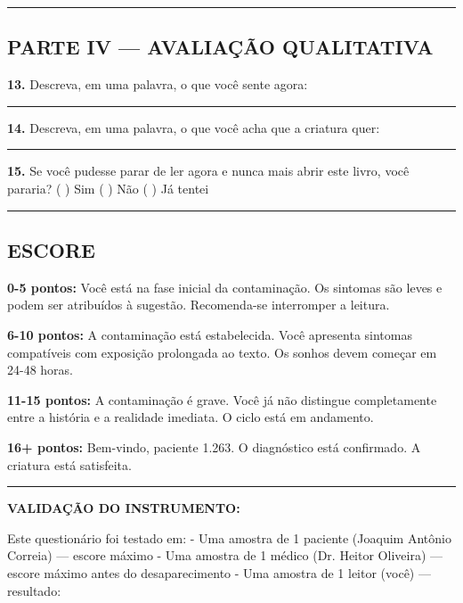 \vspace{0.5em}\noindent\rule{\textwidth}{0.5pt}\vspace{0.5em}

\subsection*{PARTE IV --- AVALIAÇÃO QUALITATIVA}

\noindent \textbf{13.} Descreva, em uma palavra, o que você sente agora:

\noindent\rule{0.92\textwidth}{0.4pt}

\noindent \textbf{14.} Descreva, em uma palavra, o que você acha que a criatura quer:

\noindent\rule{0.92\textwidth}{0.4pt}

\noindent \textbf{15.} Se você pudesse parar de ler agora e nunca mais abrir este livro, você pararia?
( ) Sim
( ) Não
( ) Já tentei

\vspace{0.5em}\noindent\rule{\textwidth}{0.5pt}\vspace{0.5em}

\subsection*{ESCORE}

\noindent \textbf{0-5 pontos:} Você está na fase inicial da contaminação. Os sintomas são leves e podem ser atribuídos à sugestão. Recomenda-se interromper a leitura.

\noindent \textbf{6-10 pontos:} A contaminação está estabelecida. Você apresenta sintomas compatíveis com exposição prolongada ao texto. Os sonhos devem começar em 24-48 horas.

\noindent \textbf{11-15 pontos:} A contaminação é grave. Você já não distingue completamente entre a história e a realidade imediata. O ciclo está em andamento.

\noindent \textbf{16+ pontos:} Bem-vindo, paciente 1.263. O diagnóstico está confirmado. A criatura está satisfeita.

\vspace{0.5em}\noindent\rule{\textwidth}{0.5pt}\vspace{0.5em}

\noindent \textbf{VALIDAÇÃO DO INSTRUMENTO:}

\noindent Este questionário foi testado em:
- Uma amostra de 1 paciente (Joaquim Antônio Correia) --- escore máximo
- Uma amostra de 1 médico (Dr. Heitor Oliveira) --- escore máximo antes do desaparecimento
- Uma amostra de 1 leitor (você) --- resultado: \makebox[2in]{\hrulefill}


